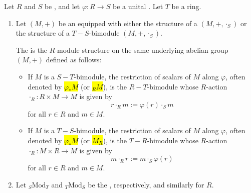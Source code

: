 \begin{definition} \label{definition:restriction_of_scalars_of_a_left_or_right_module_along_a_ring_homomorphism_from_the_base_ring}
Let $R$ and $S$ be , and let $\varphi: R \to S$ be a unital . Let $T$ be a ring.

\begin{enumerate}
    \item 
    Let $(M, +)$ be an  equipped with either the structure of a  $(M, +, \cdot_S)$ or the structure of a $T-S$-bimodule $(M, +, \cdot_S)$.

    The  is the $R$-module structure on the same underlying abelian group $(M, +)$ defined as follows:
    \begin{itemize}
        \item If $M$ is a $S-T$-bimodule, the restriction of scalars of $M$ along $\varphi$, often denoted by \hl{$\varphi_* M$} (or \hl{$_R M$}), is the $R-T$-bimodule whose $R$-action $\cdot_R: R \times M \to M$ is given by
        $$ r \cdot_R m := \varphi(r) \cdot_S m $$
        for all $r \in R$ and $m \in M$.
        \item If $M$ is a $T-S$-bimodule, the restriction of scalars of $M$ along $\varphi$, often denoted by \hl{$\varphi_* M$} (or \hl{$M_R$}), is the $T-R$-bimodule whose $R$-action $\cdot_R: M \times R \to M$ is given by
        $$ m \cdot_R r := m \cdot_S \varphi(r) $$
        for all $r \in R$ and $m \in M$.
    \end{itemize}

    \item 
    Let ${}_S \text{Mod}_T$ and ${}_T \text{Mod}_S$ be the , respectively, and similarly for $R$.


\end{enumerate}
\end{definition}
